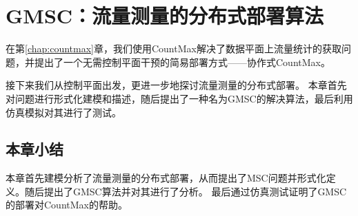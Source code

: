 %
\chapter{GMSC：流量测量的分布式部署算法}\label{chap:gmsc}
在第\ref{chap:countmax}章，我们使用CountMax解决了数据平面上流量统计的获取问题，并提出了一个无需控制平面干预的简易部署方式——协作式CountMax。

接下来我们从控制平面出发，更进一步地探讨流量测量的分布式部署。
本章首先对问题进行形式化建模和描述，随后提出了一种名为GMSC的解决算法，最后利用仿真模拟对其进行了测试。





\section{本章小结}

本章首先建模分析了流量测量的分布式部署，从而提出了MSC问题并形式化定义。随后提出了GMSC算法并对其进行了分析。
最后通过仿真测试证明了GMSC的部署对CountMax的帮助。